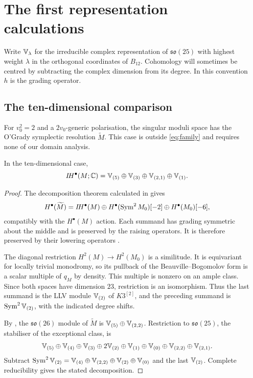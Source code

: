 \section{The first representation calculations}\label{sec:representations}

Write $\mathbb V_\lambda$ for the irreducible complex representation
of $\mathfrak{so}(25)$ with highest weight $\lambda$ in the
orthogonal coordinates of $B_{12}$. Cohomology will sometimes
be centred by subtracting the complex dimension from its degree.
In this convention $h$ is the grading operator.

\subsection{The ten-dimensional comparison}
For $v_0^2=2$ and a $2v_0$-generic polarisation, the singular
moduli space has the O'Grady symplectic resolution
$\widetilde M$. This case is outside \eqref{eq:family} and
requires none of our domain analysis.

\begin{proposition}\label{prop:og10}
In the ten-dimensional case,
\[
 I\!H^\bullet(M;\mathbb C)=
 \mathbb V_{(5)}\oplus\mathbb V_{(3)}\oplus\mathbb V_{(2,1)}\oplus\mathbb V_{(1)}.
\]
\end{proposition}
\begin{proof}
The decomposition theorem calculated in \cite{dcrs21} gives
\[
 H^\bullet(\widetilde M)=I\!H^\bullet(M)
 \oplus H^\bullet(\operatorname{Sym}^2M_0)[-2]
 \oplus H^\bullet(M_0)[-6],
\]
compatibly with the $H^\bullet(M)$ action. Each summand has
grading symmetric about the middle and is preserved by the
raising operators. It is therefore preserved by their lowering
operators \cite[Lemma~3.4]{fsy22}.

The diagonal restriction $H^2(M)\to H^2(M_0)$ is a
similitude. It is equivariant for locally trivial monodromy,
so its pullback of the Beauville--Bogomolov form is a scalar
multiple of $q_M$ by density. This multiple is nonzero on an
ample class. Since both spaces have dimension $23$, restriction
is an isomorphism. Thus the last summand is the LLV module
$\mathbb V_{(2)}$ of $K3^{[2]}$, and the preceding summand is
$\operatorname{Sym}^2\mathbb V_{(2)}$, with the indicated degree shifts.

By \cite{gklr22}, the $\mathfrak{so}(26)$ module of
$\widetilde M$ is $\mathbb V_{(5)}\oplus\mathbb V_{(2,2)}$.
Restriction to $\mathfrak{so}(25)$, the stabiliser of the
exceptional class, is
\[
 \mathbb V_{(5)}\oplus\mathbb V_{(4)}\oplus\mathbb V_{(3)}\oplus2\mathbb V_{(2)}
 \oplus\mathbb V_{(1)}\oplus\mathbb V_{(0)}\oplus\mathbb V_{(2,2)}\oplus\mathbb V_{(2,1)}.
\]
Subtract
$\operatorname{Sym}^2\mathbb V_{(2)}=\mathbb V_{(4)}\oplus\mathbb V_{(2,2)}\oplus
\mathbb V_{(2)}\oplus\mathbb V_{(0)}$ and the last $\mathbb V_{(2)}$.
Complete reducibility gives the stated decomposition.
\end{proof}

